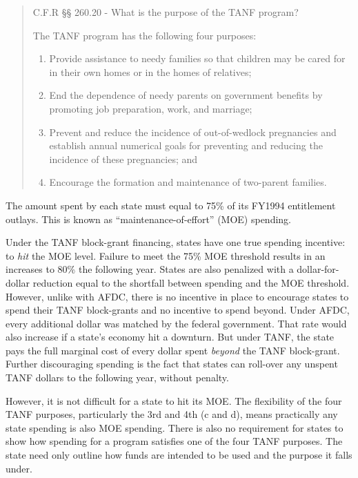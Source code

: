 \documentclass[12pt,letterpaperpaper,]{book}
\begin{document}
\begin{quote}
C.F.R §§ 260.20 - What is the purpose of the TANF program?

The TANF program has the following four purposes:

\begin{enumerate}
\def\labelenumi{(\alph{enumi})}
\item
  Provide assistance to needy families so that children may be cared for
  in their own homes or in the homes of relatives;
\item
  End the dependence of needy parents on government benefits by
  promoting job preparation, work, and marriage;
\item
  Prevent and reduce the incidence of out-of-wedlock pregnancies and
  establish annual numerical goals for preventing and reducing the
  incidence of these pregnancies; and
\item
  Encourage the formation and maintenance of two-parent families.
\end{enumerate}
\end{quote}

The amount spent by each state must equal to 75\% of its FY1994
entitlement outlays. This is known as ``maintenance-of-effort'' (MOE)
spending.

Under the TANF block-grant financing, states have one true spending
incentive: to \emph{hit} the MOE level. Failure to meet the 75\% MOE
threshold results in an increases to 80\% the following year. States are
also penalized with a dollar-for-dollar reduction equal to the shortfall
between spending and the MOE threshold. However, unlike with AFDC, there
is no incentive in place to encourage states to spend their TANF
block-grants and no incentive to spend beyond. Under AFDC, every
additional dollar was matched by the federal government. That rate would
also increase if a state's economy hit a downturn. But under TANF, the
state pays the full marginal cost of every dollar spent \emph{beyond}
the TANF block-grant. Further discouraging spending is the fact that
states can roll-over any unspent TANF dollars to the following year,
without penalty.

However, it is not difficult for a state to hit its MOE. The flexibility
of the four TANF purposes, particularly the 3rd and 4th (c and d), means
practically any state spending is also MOE spending. There is also no
requirement for states to show how spending for a program satisfies one
of the four TANF purposes. The state need only outline how funds are
intended to be used and the purpose it falls under.
\end{document}
